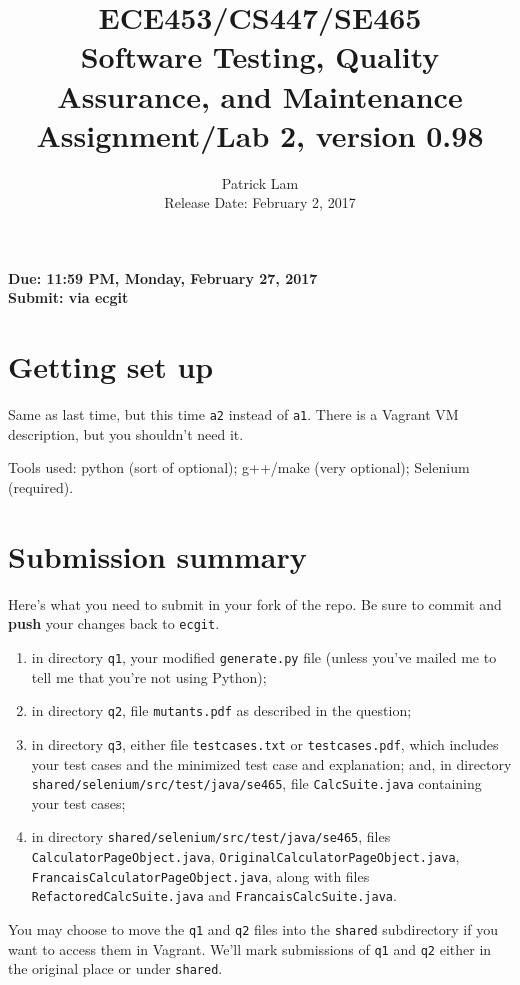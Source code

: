 \documentclass[10pt,hidelinks]{article}
\begin{document}
\title{
ECE453/CS447/SE465 \\
Software Testing, Quality Assurance, and Maintenance\\
Assignment/Lab 2, version 0.98}
\author{Patrick Lam \\
{Release Date:  February 2, 2017} \\
}
\renewcommand{\today}{}
\maketitle

\begin{center}

{\bf Due:  11:59 PM, Monday, February 27, 2017} \\
{\bf Submit: via ecgit }\\
\end{center}

\section*{Getting set up}
Same as last time, but this time {\tt a2} instead of {\tt a1}. There is a Vagrant VM description,
but you shouldn't need it.

Tools used: python (sort of optional); g++/make (very optional); Selenium (required).

\section*{Submission summary}
Here's what you need to submit in your fork of the repo. Be sure to commit
and {\bf push} your changes back to {\tt ecgit}.
\begin{enumerate}
\item in directory {\tt q1}, your modified {\tt generate.py} file (unless you've mailed me to tell me that you're not using Python);
\item in directory {\tt q2}, file {\tt mutants.pdf} as described in the question;
\item in directory {\tt q3}, either file {\tt testcases.txt} or {\tt testcases.pdf}, which includes your test cases and the minimized test case and explanation; and, in directory {\tt shared/selenium/src/test/java/se465}, file {\tt CalcSuite.java} containing your test cases;
\item in directory {\tt shared/selenium/src/test/java/se465}, files {\tt CalculatorPageObject.java}, {\tt OriginalCalculatorPageObject.java}, {\tt FrancaisCalculatorPageObject.java}, along with files {\tt RefactoredCalcSuite.java} and {\tt FrancaisCalcSuite.java}.
\end{enumerate}
You may choose to move the {\tt q1} and {\tt q2} files into the {\tt shared} subdirectory if you want to access them in Vagrant. We'll mark submissions of {\tt q1} and {\tt q2} either in the original place or under {\tt shared}.
 
\end{document}
